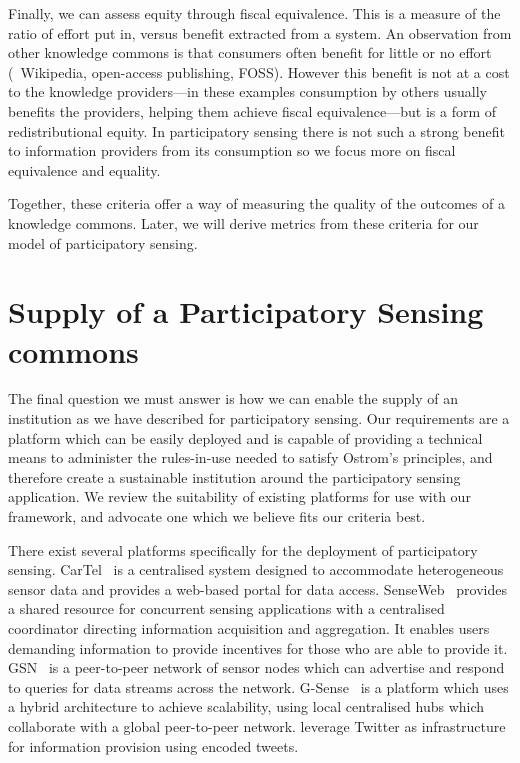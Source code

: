 Finally, we can assess equity through fiscal equivalence. 
This is a measure of the ratio of effort put in, versus benefit extracted from a system. 
An observation from other knowledge commons is that consumers often benefit for little or no effort (\eg\ Wikipedia, open-access publishing, FOSS). However this benefit is not at a cost to the knowledge providers---in these examples consumption by others usually benefits the providers, helping them achieve fiscal equivalence---but is a form of redistributional equity. In participatory sensing there is not such a strong benefit to information providers from its consumption so we focus more on fiscal equivalence and equality.

Together, these criteria offer a way of measuring the quality of the outcomes
of a knowledge commons. Later, we will derive metrics from these criteria for
our model of participatory sensing.

\section{Supply of a Participatory Sensing commons}


The final question we must answer is how we can enable the supply of an institution as we have described for participatory sensing. 
Our requirements are a platform which can be easily deployed and is capable of providing a technical means to administer the rules-in-use needed to satisfy Ostrom's principles, and therefore create a sustainable institution around the participatory sensing application. 
We review the suitability of existing platforms for use with our framework, and advocate one which we believe fits our criteria best.


There exist several platforms specifically for the deployment of participatory sensing. 
CarTel~\citep{Hull2006} is a centralised system designed to accommodate heterogeneous sensor data and provides a web-based portal for data access. 
SenseWeb~\citep{Kansal2007} provides a shared resource for concurrent sensing applications with a centralised coordinator directing information acquisition and aggregation. 
It enables users demanding information to provide incentives for those who are able to provide it. 
\ac{GSN}~\citep{Aberer2006} is a peer-to-peer network of sensor nodes which can advertise and respond to queries for data streams across the network. 
G-Sense~\citep{Perez2010} is a platform which uses a hybrid architecture to achieve scalability, using local centralised hubs which collaborate with a global peer-to-peer network. 
 leverage Twitter as infrastructure for information provision using encoded tweets.

